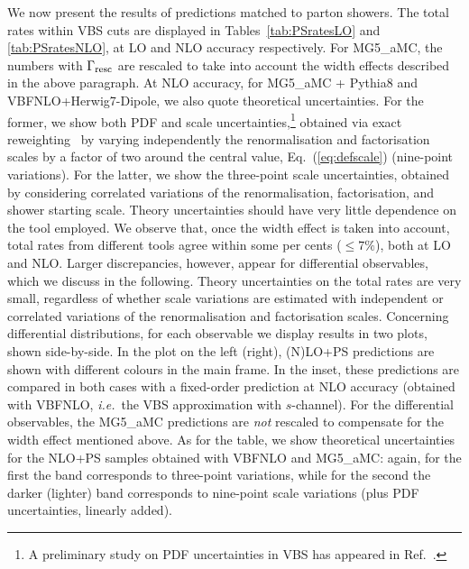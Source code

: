 \documentclass[twocolumn,epjc3]{svjour3} %
\newlength{\width}
\begin{document}
We now present the results of predictions matched to parton showers.
The total rates within VBS cuts are displayed in Tables~\ref{tab:PSratesLO} and
\ref{tab:PSratesNLO}, at LO and NLO
accuracy respectively. For {\sc MG5\_aMC},
the numbers with $\Gamma_{\rm resc}$ are rescaled to
take into account the width effects described in the above paragraph. At NLO accuracy, for {\sc MG5\_aMC} + {\sc Pythia8} and {\sc VBFNLO}+{\sc Herwig7-Dipole}, we also quote
theoretical uncertainties.
For the former, we show both PDF and scale uncertainties,\footnote{A preliminary study on PDF uncertainties in VBS has appeared
in Ref.~\cite{Dittmaier:2018zzz}.} obtained via exact reweighting~\cite{Frederix:2011ss} by varying independently the renormalisation and factorisation
scales by a factor of two around the central value, Eq.~(\ref{eq:defscale}) (nine-point variations).
For the latter, we show the
three-point scale uncertainties, obtained by considering correlated variations of the renormalisation, factorisation, and shower starting scale. Theory uncertainties should have very little dependence on the tool employed.
We observe that, once the width effect is taken into
account, total rates from different tools agree within some per cents ($\le7\%$), both at LO and NLO. Larger discrepancies, however, appear for differential observables, which we discuss in
the following. Theory uncertainties on the total rates are very small, regardless of whether scale variations are estimated with 
independent or correlated variations of the renormalisation and factorisation scales.
Concerning differential distributions, for each observable we display results in two plots, shown side-by-side. In the plot on the left (right), (N)LO+PS predictions are shown
with different colours in the main frame. In the inset, these predictions are compared in both cases with a fixed-order prediction at NLO accuracy (obtained with
{\sc VBFNLO}, \emph{i.e.}\ the VBS approximation with $s$-channel).
For the differential observables, the {\sc MG5\_aMC} predictions are \emph{not} rescaled to compensate for the width effect mentioned above. As for the table, we show theoretical uncertainties for the NLO+PS samples
obtained with {\sc VBFNLO} and {\sc MG5\_aMC}:
again, for the first the band corresponds to three-point variations, while for the second the darker (lighter) band corresponds to nine-point
scale variations (plus PDF uncertainties, linearly added).
\end{document}
